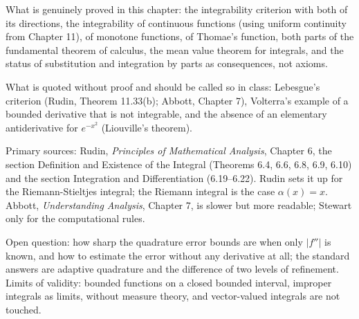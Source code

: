 \begin{untukpeneliti}
What is genuinely proved in this chapter: the integrability criterion with both of its directions,
the integrability of continuous functions (using uniform continuity from Chapter 11), of monotone
functions, of Thomae's function, both parts of the fundamental theorem of calculus, the mean value theorem
for integrals, and the status of substitution and integration by parts as consequences, not
axioms.

What is quoted without proof and should be called so in class: Lebesgue's criterion
(Rudin, Theorem 11.33(b); Abbott, Chapter 7), Volterra's example of a bounded derivative that
is not integrable, and the absence of an elementary antiderivative for $e^{-x^2}$ (Liouville's
theorem).

Primary sources: Rudin, \emph{Principles of Mathematical Analysis}, Chapter 6, the section
Definition and Existence of the Integral (Theorems 6.4, 6.6, 6.8, 6.9, 6.10) and the section
Integration and Differentiation (6.19--6.22). Rudin sets it up for the
Riemann-Stieltjes integral; the Riemann integral is the case $\alpha(x)=x$. Abbott,
\emph{Understanding Analysis}, Chapter 7, is slower but more readable; Stewart only
for the computational rules.

Open question: how sharp the quadrature error bounds are when only $|f''|$ is
known, and how to estimate the error without any derivative at all; the standard
answers are adaptive quadrature and the difference of two levels of refinement. Limits of validity:
bounded functions on a closed bounded interval, improper integrals as limits, without
measure theory, and vector-valued integrals are not touched.
\end{untukpeneliti}


